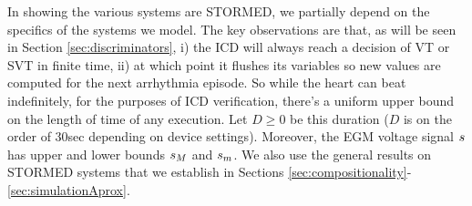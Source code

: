 In showing the various systems are STORMED, we partially depend on the specifics of the systems we model. 
The key observations are that, as will be seen in Section \ref{sec:discriminators},
i) the \ac{ICD} will always reach a decision of VT or SVT in finite time, 
ii) at which point it flushes its variables so new values are computed for the next arrhythmia episode.
So while the heart can beat indefinitely, for the purposes of \ac{ICD} verification, 
there's a uniform upper bound on the length of time of any execution.
Let $D \geq 0$ be this duration ($D$ is on the order of 30sec depending on device settings).
Moreover, the \ac{EGM} voltage signal $s$ has upper and lower bounds $s_M$ and $s_m$.
We also use the general results on STORMED systems that we establish in Sections  \ref{sec:compositionality}-\ref{sec:simulationAprox}.
%
